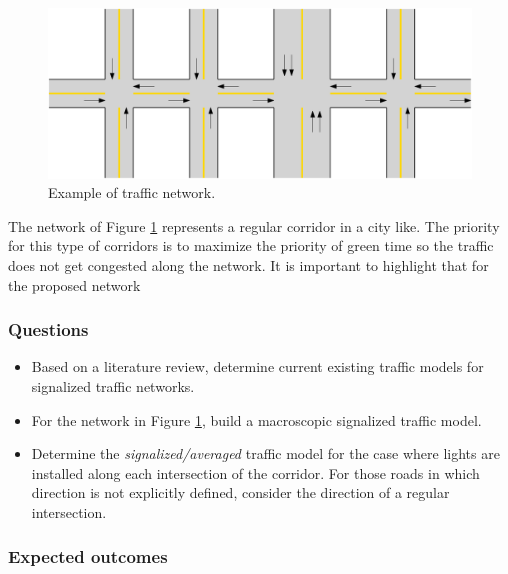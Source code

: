 \documentclass[]{book}
\providecommand{\tightlist}{%
  \setlength{\itemsep}{0pt}\setlength{\parskip}{0pt}}
\theoremstyle{definition}
\theoremstyle{definition}
\theoremstyle{definition}
\theoremstyle{remark}
\begin{document}
\begin{figure}

{\centering \includegraphics{images/p1-01-network} 

}

\caption{Example of traffic network.}\label{fig:city}
\end{figure}

The network of Figure \ref{fig:city} represents a regular corridor in a
city like. The priority for this type of corridors is to maximize the
priority of green time so the traffic does not get congested along the
network. It is important to highlight that for the proposed network

\hypertarget{questions}{%
\subsubsection*{Questions}\label{questions}}

\begin{itemize}
\tightlist
\item
  Based on a literature review, determine current existing traffic
  models for signalized traffic networks.
\item
  For the network in Figure \ref{fig:city}, build a macroscopic
  signalized traffic model.
\item
  Determine the \emph{signalized/averaged} traffic model for the case
  where lights are installed along each intersection of the corridor.
  For those roads in which direction is not explicitly defined, consider
  the direction of a regular intersection.
\end{itemize}

\hypertarget{expected-outcomes}{%
\subsubsection*{Expected outcomes}\label{expected-outcomes}}
\end{document}
